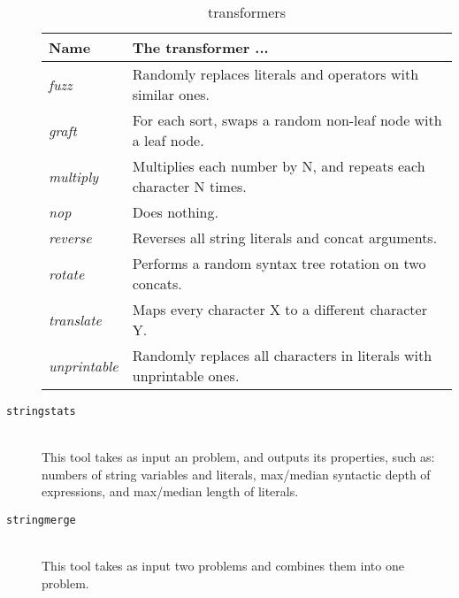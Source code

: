 \begin{description}
            \begin{table}
                \centering
                \begin{tabular}{|l|l|}
                    \hline
                    \textbf{Name}        & \textbf{The transformer ...} \\ \hline
                    \textit{fuzz}        & Randomly replaces literals and operators with similar ones. \\ \hline
                    \textit{graft}       & For each sort, swaps a random non-leaf node with a leaf node. \\ \hline
                    \textit{multiply}    & Multiplies each number by N, and repeats each character N times. \\ \hline
                    \textit{nop}         & Does nothing. \\ \hline
                    \textit{reverse}     & Reverses all string literals and concat arguments. \\ \hline
                    \textit{rotate}      & Performs a random syntax tree rotation on two concats. \\ \hline
                    \textit{translate}   & Maps every character X to a different character Y. \\ \hline
                    \textit{unprintable} & Randomly replaces all characters in literals with unprintable ones. \\ \hline
                \end{tabular}
                \caption{\transformer{} transformers}
                \label{tbl:transformers}
            \end{table}

        \item[\texttt{stringstats}] \hfill \\
            This tool takes as input an \smt{} problem, and outputs its properties, such as: numbers of string variables and literals, max/median syntactic depth of expressions, and max/median length of literals.
            \hfill \\

        \item[\texttt{stringmerge}] \hfill \\
            This tool takes as input two \smt{} problems and combines them into one problem.


    \end{description}

